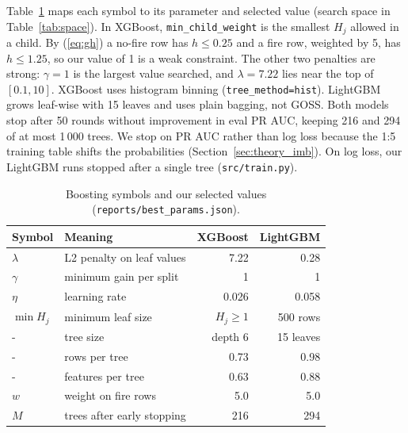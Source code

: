 \begin{projectbox}
Table~\ref{tab:hyper} maps each symbol to its parameter and selected value (search space in
Table~\ref{tab:space}). In XGBoost, \texttt{min\_child\_weight} is the smallest $H_j$ allowed in a child.
By (\ref{eq:gh}) a no-fire row has $h \le 0.25$ and a fire row, weighted by 5, has $h \le 1.25$, so our
value of 1 is a weak constraint. The other two penalties are strong: $\gamma = 1$ is the largest value
searched, and $\lambda = 7.22$ lies near the top of $[0.1, 10]$. XGBoost uses histogram binning
(\texttt{tree\_method=hist}). LightGBM grows leaf-wise with 15 leaves and uses plain bagging, not GOSS.
Both models stop after 50 rounds without improvement in eval PR AUC, keeping 216 and 294 of at most
1\,000 trees. We stop on PR AUC rather than log loss because the 1:5 training table shifts the
probabilities (Section~\ref{sec:theory_imb}). On log loss, our LightGBM runs stopped after a single tree
(\texttt{src/train.py}).
\end{projectbox}

\begin{table}[t]
\centering
\caption{Boosting symbols and our selected values (\texttt{reports/best\_params.json}).}
\label{tab:hyper}
\small
\setlength{\tabcolsep}{4pt}
\renewcommand{\arraystretch}{1.12}
\begin{tabular}{l>{\raggedright\arraybackslash}p{2.75cm}rr}
\toprule
\rowcolor{tblhead}
\textbf{Symbol} & \textbf{Meaning} & \textbf{XGBoost} & \textbf{LightGBM} \\
\midrule
$\lambda$ & L2 penalty on leaf values & 7.22 & 0.28 \\
$\gamma$ & minimum gain per split & 1 & 1 \\
$\eta$ & learning rate & 0.026 & 0.058 \\
$\min H_j$ & minimum leaf size & $H_j \ge 1$ & 500 rows \\
- & tree size & depth 6 & 15 leaves \\
- & rows per tree & 0.73 & 0.98 \\
- & features per tree & 0.63 & 0.88 \\
$w$ & weight on fire rows & 5.0 & 5.0 \\
$M$ & trees after early stopping & 216 & 294 \\
\bottomrule
\end{tabular}
\end{table}

